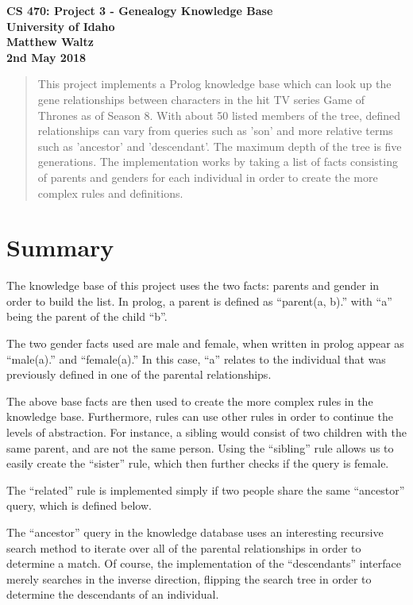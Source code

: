 \documentclass[11pt,letterpaper]{article}
\author{Matthew Waltz}
\begin{document}
\begin{center}
   \textbf{CS 470: Project 3 - Genealogy Knowledge Base} \\
   \textbf{University of Idaho} \\
   \textbf{Matthew Waltz} \\
   \textbf{2nd May 2018} \\
\end{center}

\begin{abstract}
This project implements a Prolog knowledge base which can look up the gene relationships between characters in the hit TV series Game of Thrones as of Season 8.
With about 50 listed members of the tree, defined relationships can vary from queries such as 'son' and more relative terms such as 'ancestor' and 'descendant'.
The maximum depth of the tree is five generations.
The implementation works by taking a list of facts consisting of parents and genders for each individual in order to create the more complex rules and definitions.
\end{abstract}

\tableofcontents

\clearpage

\section{Summary}
The knowledge base of this project uses the two facts: parents and gender in order to build the list.
In prolog, a parent is defined as ``parent(a, b).'' with ``a'' being the parent of the child ``b''.

The two gender facts used are male and female, when written in prolog appear as ``male(a).'' and ``female(a).'' In this case, ``a'' relates to the individual that was previously defined in one of the parental relationships.

The above base facts are then used to create the more complex rules in the knowledge base. Furthermore, rules can use other rules in order to continue the levels of abstraction. For instance, a sibling would consist of two children with the same parent, and are not the same person. Using the ``sibling'' rule allows us to easily create the ``sister'' rule, which then further checks if the query is female.

The ``related'' rule is implemented simply if two people share the same ``ancestor'' query, which is defined below.

The ``ancestor'' query in the knowledge database uses an interesting recursive search method to iterate over all of the parental relationships in order to determine a match. Of course, the implementation of the ``descendants'' interface merely searches in the inverse direction, flipping the search tree in order to determine the descendants of an individual.
\end{document}

